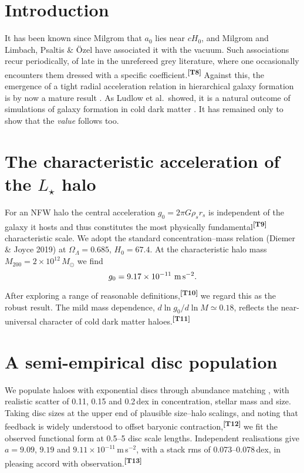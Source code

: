 \documentclass[10pt]{article}
\newcommand{\tell}[1]{\textsuperscript{\color{rt}\bfseries[T#1]}}
\begin{document}
\section{Introduction}
It has been known since Milgrom \cite{M83} that $a_0$ lies near $cH_0$, and Milgrom \cite{M99} and Limbach, Psaltis \& \"Ozel \cite{LPO} have associated it with the vacuum. Such associations recur periodically, of late in the unrefereed grey literature, where one occasionally encounters them dressed with a specific coefficient.\tell{8} Against this, the emergence of a tight radial acceleration relation in hierarchical galaxy formation is by now a mature result \cite{N17,L17,KW17,D19}. As Ludlow et al.\ showed, it is a natural outcome of simulations of galaxy formation in cold dark matter \cite{L17}. It has remained only to show that the \emph{value} follows too.

\section{The characteristic acceleration of the $L_\star$ halo}
For an NFW halo the central acceleration $g_0=2\pi G\rho_s r_s$ is independent of the galaxy it hosts and thus constitutes the most physically fundamental\tell{9} characteristic scale. We adopt the standard concentration--mass relation (Diemer \& Joyce 2019) at $\Omega_\Lambda=0.685$, $H_0=67.4$. At the characteristic halo mass $M_{200}=2\times10^{12}\,M_\odot$ we find
\[
g_0=9.17\times10^{-11}\ \text{m\,s}^{-2}.
\]
After exploring a range of reasonable definitions,\tell{10} we regard this as the robust result. The mild mass dependence, $d\ln g_0/d\ln M\simeq0.18$, reflects the near-universal character of cold dark matter haloes.\tell{11}

\section{A semi-empirical disc population}
We populate haloes with exponential discs through abundance matching \cite{Mo13}, with realistic scatter of 0.11, 0.15 and 0.2\,dex in concentration, stellar mass and size. Taking disc sizes at the upper end of plausible size--halo scalings, and noting that feedback is widely understood to offset baryonic contraction,\tell{12} we fit the observed functional form at 0.5--5 disc scale lengths. Independent realisations give $a=9.09$, $9.19$ and $9.11\times10^{-11}$\,m\,s$^{-2}$, with a stack rms of 0.073--0.078\,dex, in pleasing accord with observation.\tell{13}
\end{document}
